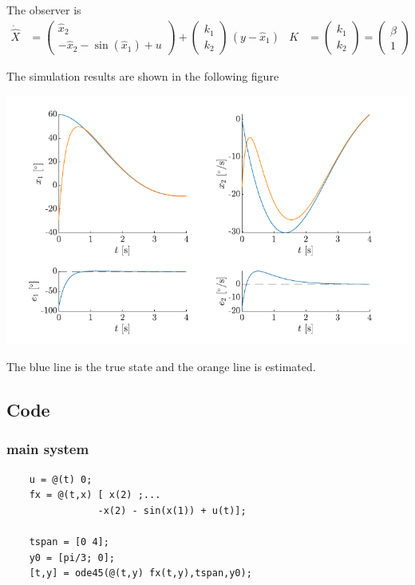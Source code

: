 The observer is 
\begin{align*}
    \dot{\hat X} &= \begin{pmatrix}
        \hat x_2 \\ -\hat x_2 - \sin\left(\hat x_1\right) + u
    \end{pmatrix} + \begin{pmatrix}
        k_1 \\ k_2
    \end{pmatrix}\,\left(y - \hat x_1\right) & K &= \begin{pmatrix}
        k_1 \\ k_2
    \end{pmatrix} = \begin{pmatrix}
        \beta \\ 1
    \end{pmatrix}
\end{align*}

The simulation results are shown in the following figure 

\includegraphics{figures/ex2_6.pdf}

The blue line is the true state and the orange line is estimated.

\subsection*{Code}
\subsubsection*{main system}
\begin{verbatim}
    u = @(t) 0;
    fx = @(t,x) [ x(2) ;...
                -x(2) - sin(x(1)) + u(t)];
    
    tspan = [0 4];
    y0 = [pi/3; 0];
    [t,y] = ode45(@(t,y) fx(t,y),tspan,y0);
\end{verbatim}

